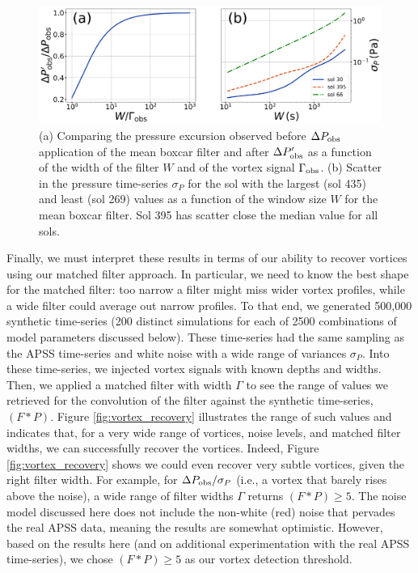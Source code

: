 \documentclass[linenumbers,trackchanges]{aastex63}
\begin{document}
\begin{figure}
    \centering
    \includegraphics[width=\textwidth]{figures/Pobsprime-sigmaP_vs_W.png}
    \caption{(a) Comparing the pressure excursion observed before $\Delta P_{\rm obs}$ application of the mean boxcar filter and after $\Delta P_{\rm obs}^\prime$ as a function of the width of the filter $W$ and of the vortex signal $\Gamma_{\rm obs}$. (b) Scatter in the pressure time-series $\sigma_P$ for the sol with the largest (sol 435) and least (sol 269) values as a function of the window size $W$ for the mean boxcar filter. Sol 395 has scatter close the median value for all sols. }
    \label{fig:Pobsprime-sigmaP_vs_W}
\end{figure}

Finally, we must interpret these results in terms of our ability to recover vortices using our matched filter approach. In particular, we need to know the best shape for the matched filter: too narrow a filter might miss wider vortex profiles, while a wide filter could average out narrow profiles. To that end, we generated 500,000 synthetic time-series (200 distinct simulations for each of 2500 combinations of model parameters discussed below). These time-series had the same sampling as the APSS time-series and white noise with a wide range of variances $\sigma_P$. Into these time-series, we injected vortex signals with known depths and widths. Then, we applied a matched filter with width $\Gamma$ to see the range of values we retrieved for the convolution of the filter against the synthetic time-series, $\left( F \ast P \right)$. Figure \ref{fig:vortex_recovery} illustrates the range of such values and indicates that, for a very wide range of vortices, noise levels, and matched filter widths, we can successfully recover the vortices. Indeed, Figure \ref{fig:vortex_recovery} shows we could even recover very subtle vortices, given the right filter width. For example, for $\Delta P_{\rm obs}/\sigma_P$ (i.e., a vortex that barely rises above the noise), a wide range of filter widths $\Gamma$ returns $\left( F \ast P \right) \geq 5 $. The noise model discussed here does not include the non-white (red) noise that pervades the real APSS data, meaning the results are somewhat optimistic. However, based on the results here (and on additional experimentation with the real APSS time-series), we chose $\left( F \ast P \right) \geq 5 $ as our vortex detection threshold.
\end{document}
